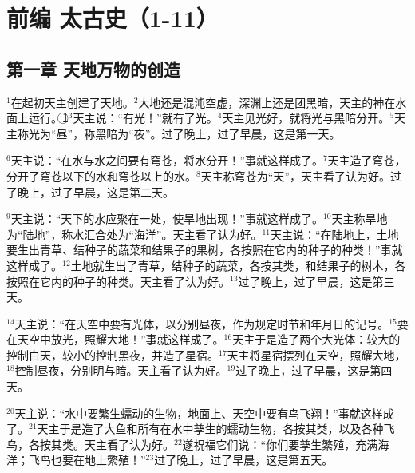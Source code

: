 \section{前编  太古史（1-11）}


\subsection{第一章 天地万物的创造}

$^{1}$在起初天主创建了天地。$^{2}$大地还是混沌空虚，深渊上还是团黑暗，天主的神在水面上运行。\textcircled{1}$^{3}$天主说：“有光！”就有了光。$^{4}$天主见光好，就将光与黑暗分开。$^{5}$天主称光为“昼”，称黑暗为“夜”。过了晚上，过了早晨，这是第一天。

$^{6}$天主说：“在水与水之间要有穹苍，将水分开！”事就这样成了。$^{7}$天主造了穹苍，分开了穹苍以下的水和穹苍以上的水。$^{8}$天主称穹苍为“天”，天主看了认为好。过了晚上，过了早晨，这是第二天。

$^{9}$天主说：“天下的水应聚在一处，使旱地出现！”事就这样成了。$^{10}$天主称旱地为“陆地”，称水汇合处为“海洋”。天主看了认为好。$^{11}$天主说：“在陆地上，土地要生出青草、结种子的蔬菜和结果子的果树，各按照在它内的种子的种类！”事就这样成了。$^{12}$土地就生出了青草，结种子的蔬菜，各按其类，和结果子的树木，各按照在它内的种子的种类。天主看了认为好。$^{13}$过了晚上，过了早晨，这是第三天。

$^{14}$天主说：“在天空中要有光体，以分别昼夜，作为规定时节和年月日的记号。$^{15}$要在天空中放光，照耀大地！”事就这样成了。$^{16}$天主于是造了两个大光体：较大的控制白天，较小的控制黑夜，并造了星宿。$^{17}$天主将星宿摆列在天空，照耀大地，$^{18}$控制昼夜，分别明与暗。天主看了认为好。$^{19}$过了晚上，过了早晨，这是第四天。

$^{20}$天主说：“水中要繁生蠕动的生物，地面上、天空中要有鸟飞翔！”事就这样成了。$^{21}$天主于是造了大鱼和所有在水中孳生的蠕动生物，各按其类，以及各种飞鸟，各按其类。天主看了认为好。$^{22}$遂祝福它们说：“你们要孳生繁殖，充满海洋；飞鸟也要在地上繁殖！”$^{23}$过了晚上，过了早晨，这是第五天。

